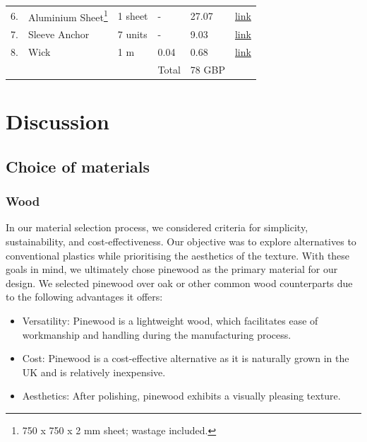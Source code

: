 \documentclass[12pt]{extarticle} %
\begin{document}
\begin{table}[ht]
\begin{center}
\begin{minipage}{500pt}
\begin{tabular}{m{2.5em}  m{8em} m{6em}  m{6em}  m{10em} m{4em}}
        6. &  Aluminium Sheet\footnote{750 x 750 x 2 mm sheet; wastage included.} & 1 sheet  & - & 27.07 & \href{https://www.1stchoicemetals.co.uk/product/2mm-3/}{link}\label{bill:alumninium_sheet}\\
        
        7. & Sleeve Anchor & 7 units & - & 9.03 & \href{https://www.hilti.co.uk/c/CLS_FASTENER_7135/CLS_SLEEVE_ANCHORS_NAIL_ANCHORS_7135/r3955}{link}\\
        8. & Wick & 1 m & 0.04 & 0.68 & \href{https://www.alibaba.com/product-detail/Macrame-Twist-Braided-Cord-100-Macrame_1600204884923.html?}{link}\\
        \midrule
        & & & Total & 78 GBP\\
    \bottomrule
  \end{tabular}
  \end{minipage}
  \end{center}
  \end{table}

\section{Discussion}
\subsection{Choice of materials}\label{topic:choice_of_materials}
\subsubsection{Wood}
In our material selection process, we considered criteria for simplicity, sustainability, and cost-effectiveness. Our objective was to explore alternatives to conventional plastics while prioritising the aesthetics of the texture. With these goals in mind, we ultimately chose pinewood as the primary material for our design. We selected pinewood over oak or other common wood counterparts due to the following advantages it offers:

\begin{itemize}
    \item Versatility: Pinewood is a lightweight wood, which facilitates ease of workmanship and handling during the manufacturing process.
    \item Cost: Pinewood is a cost-effective alternative as it is naturally grown in the UK and is relatively inexpensive.
    \item Aesthetics: After polishing, pinewood exhibits a visually pleasing texture.
\end{itemize}
\end{document}
